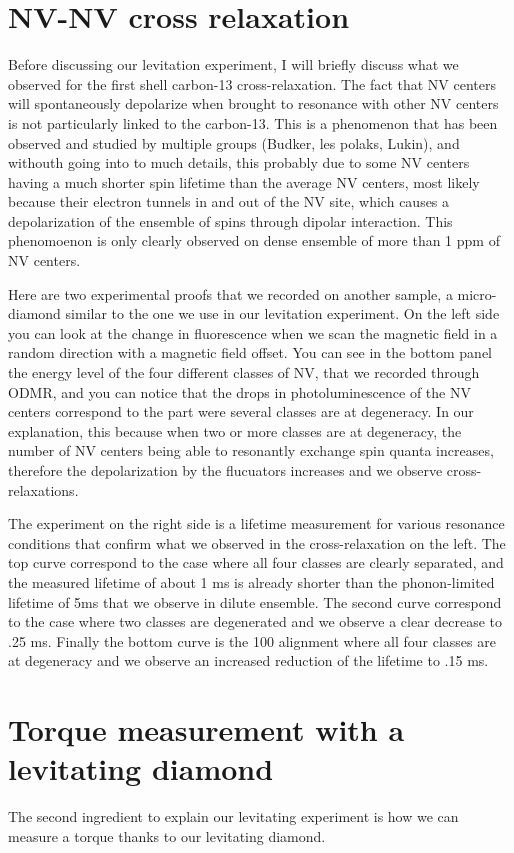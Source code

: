 \documentclass[a4paper]{article}
\begin{document}
\section{NV-NV cross relaxation}
Before discussing our levitation experiment, I will briefly discuss what we observed for the first shell carbon-13 cross-relaxation. The fact that NV centers will spontaneously depolarize when brought to resonance with other NV centers is not particularly linked to the carbon-13. This is a phenomenon that has been observed and studied by multiple groups (Budker, les polaks, Lukin), and withouth going into to much details, this probably due to some NV centers having a much shorter spin lifetime than the average NV centers, most likely because their electron tunnels in and out of the NV site, which causes a depolarization of the ensemble of spins through dipolar interaction. This phenomoenon is only clearly observed on dense ensemble of more than 1 ppm of NV centers.

Here are two experimental proofs that we recorded on another sample, a micro-diamond similar to the one we use in our levitation experiment. On the left side you can look at the change in fluorescence when we scan the magnetic field in a random direction with a magnetic field offset. You can see in the bottom panel the energy level of the four different classes of NV, that we recorded through ODMR, and you can notice that the drops in photoluminescence of the NV centers correspond to the part were several classes are at degeneracy. In our explanation, this because when two or more classes are at degeneracy, the number of NV centers being able to resonantly exchange spin quanta increases, therefore the depolarization by the flucuators increases and we observe cross-relaxations.

The experiment on the right side is a lifetime measurement for various resonance conditions that confirm what we observed in the cross-relaxation on the left.  The top curve correspond to the case where all four classes are clearly separated, and the measured lifetime of about 1 ms is already shorter than the phonon-limited lifetime of 5ms that we observe in dilute ensemble. The second curve correspond to the case where two classes are degenerated and we observe a clear decrease to .25 ms. Finally the bottom curve is the 100 alignment where all four classes are at degeneracy and we observe an increased reduction of the lifetime to .15 ms.

\section{Torque measurement with a levitating diamond}
The second ingredient to explain our levitating experiment is how we can measure a torque thanks to our levitating diamond.
\end{document}
